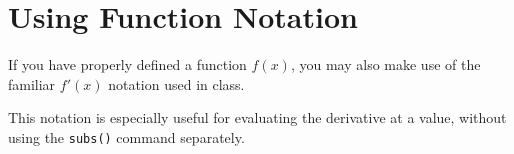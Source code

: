 \begin{maplegroup}
\begin{mapleinput}
\end{mapleinput}
\mapleresult
\begin{maplelatex}
\end{maplelatex}
\end{maplegroup}

\section{Using Function Notation}
\label{sec:derivs_using_function_notation}

If you have properly defined a function $f(x)$, you may also make use of the familiar $f'(x)$ notation used in class.
\begin{maplegroup}
\begin{mapleinput}
\end{mapleinput}
\mapleresult
\begin{maplelatex}
\end{maplelatex}
\end{maplegroup}

\begin{maplegroup}
\begin{mapleinput}
\end{mapleinput}
\mapleresult
\begin{maplelatex}
\end{maplelatex}
\end{maplegroup}

\noindent
This notation is especially useful for evaluating the derivative at a value, without using the \texttt{subs()} command separately.

\begin{maplegroup}
\begin{mapleinput}
\end{mapleinput}
\mapleresult
\begin{maplelatex}
\end{maplelatex}
\end{maplegroup}

